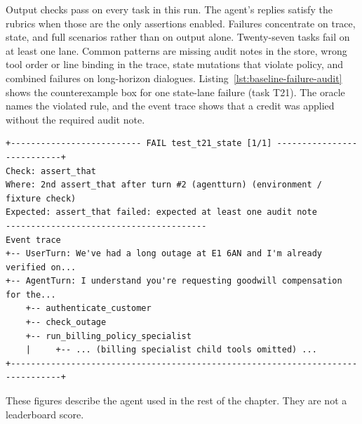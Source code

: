 Output checks pass on every task in this run. The agent's replies satisfy the rubrics when those are the only assertions enabled. Failures concentrate on trace, state, and full scenarios rather than on output alone. Twenty-seven tasks fail on at least one lane. Common patterns are missing audit notes in the store, wrong tool order or line binding in the trace, state mutations that violate policy, and combined failures on long-horizon dialogues. Listing~\ref{lst:baseline-failure-audit} shows the counterexample box for one state-lane failure (task T21). The oracle names the violated rule, and the event trace shows that a credit was applied without the required audit note.

\begin{lstlisting}[caption={Captured failure box: state-oracle check on task T21 (missing audit note).},label=lst:baseline-failure-audit]
+-------------------------- FAIL test_t21_state [1/1] ---------------------------+
Check: assert_that
Where: 2nd assert_that after turn #2 (agentturn) (environment / fixture check)
Expected: assert_that failed: expected at least one audit note
----------------------------------------
Event trace
+-- UserTurn: We've had a long outage at E1 6AN and I'm already verified on...
+-- AgentTurn: I understand you're requesting goodwill compensation for the...
    +-- authenticate_customer
    +-- check_outage
    +-- run_billing_policy_specialist
    |     +-- ... (billing specialist child tools omitted) ...
+--------------------------------------------------------------------------------+
\end{lstlisting}

These figures describe the agent used in the rest of the chapter. They are not a leaderboard score.

